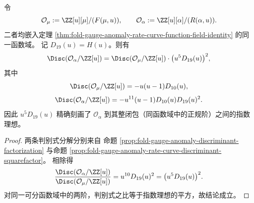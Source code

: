 \begin{theorem}[判别式平方因子的指数理想公式]\label{thm:fold-gauge-anomaly-rate-curve-index-ideal-formula}
令
\[
\mathcal O_{\mu}:=\ZZ[u][\mu]/(F(\mu,u)),\qquad
\mathcal O_{\alpha}:=\ZZ[u][\alpha]/(R(\alpha,u)).
\]
二者均嵌入定理 \ref{thm:fold-gauge-anomaly-rate-curve-function-field-identity} 的同一函数域。
记 \(D_{19}(u)=H(u)\)。则有
\[
\Disc(\mathcal O_{\alpha}/\ZZ[u])
=\Disc(\mathcal O_{\mu}/\ZZ[u])\cdot\bigl(u^5D_{19}(u)\bigr)^2,
\]
其中
\[
\Disc(\mathcal O_{\mu}/\ZZ[u])=-u(u-1)D_{10}(u),
\]
\[
\Disc(\mathcal O_{\alpha}/\ZZ[u])=-u^{11}(u-1)D_{10}(u)D_{19}(u)^2.
\]
因此 \(u^5D_{19}(u)\) 精确刻画了 \(\mathcal O_{\alpha}\) 到其整闭包（同函数域中的正规阶）之间的指数理想。
\end{theorem}

\begin{proof}
两条判别式分解分别来自
命题 \ref{prop:fold-gauge-anomaly-discriminant-factorization}
与命题 \ref{prop:fold-gauge-anomaly-rate-curve-discriminant-squarefactor}。
相除得
\[
\frac{\Disc(\mathcal O_{\alpha}/\ZZ[u])}{\Disc(\mathcal O_{\mu}/\ZZ[u])}
=u^{10}D_{19}(u)^2
=\bigl(u^5D_{19}(u)\bigr)^2.
\]
对同一可分函数域中的两阶，判别式之比等于指数理想的平方，故结论成立。
\end{proof}

\begin{remark}[局部审计公式块]\label{rem:fold-gauge-anomaly-rate-curve-singularity-audit-block}

\end{remark}
